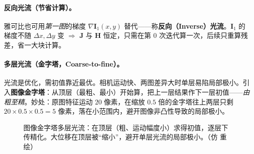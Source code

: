 \paragraph{反向光流（节省计算）\cite{gaoxiang2019slam14}。}雅可比也可用\emph{第一图}的梯度 $\nabla\mathbf{I}_1(x,y)$ 替代——称\textbf{反向（Inverse）光流}。$\mathbf{I}_1$ 的梯度不随 $\Delta x,\Delta y$ 变 $\Rightarrow$ $\mathbf{J}$ 与 $\mathbf{H}$ 恒定，只需在第 $0$ 次迭代算一次，后续只重算残差，省一大块计算。

\paragraph{多层光流（金字塔，Coarse-to-fine）\cite{gaoxiang2019slam14}。}光流是优化，需初值靠近最优。相机运动快、两图差异大时单层易陷局部极小。引入\textbf{图像金字塔}：从顶层（最粗、最小）开始算，把上一层结果作下一层初值——\emph{由粗至精}。妙处：原图特征运动 $20$ 像素，在缩放 $0.5$ 倍的金字塔往上两层只剩 $20\times0.5\times0.5=5$ 像素，落在小范围内，避开图像非凸性导致的局部极小。

\begin{figure}[ht]
\centering
{}
\caption{图像金字塔多层光流：在顶层（粗、运动幅度小）求得初值，逐层下传精化。大位移在顶层被“缩小”，避开单层光流的局部极小。（仿\cite{gaoxiang2019slam14} 重绘）}
\label{fig:vo-pyramid}
\end{figure}


